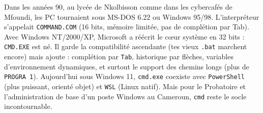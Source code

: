 \documentclass[11pt]{article}
\begin{document}
\begin{savaistu}
Dans les années 90, au lycée de Nkolbisson comme dans les cybercafés de Mfoundi, les PC tournaient sous MS-DOS 6.22 ou Windows 95/98. L'interpréteur s'appelait \texttt{COMMAND.COM} (16 bits, mémoire limitée, pas de complétion par Tab). Avec Windows NT/2000/XP, Microsoft a réécrit le cœur système en 32 bits : \texttt{CMD.EXE} est né. Il garde la compatibilité ascendante (tes vieux \texttt{.bat} marchent encore) mais ajoute : complétion par \texttt{Tab}, historique par flèches, variables d'environnement dynamiques, et surtout le support des chemins longs (plus de \texttt{PROGRA~1}). Aujourd'hui sous Windows 11, \texttt{cmd.exe} coexiste avec \texttt{PowerShell} (plus puissant, orienté objet) et \texttt{WSL} (Linux natif). Mais pour le Probatoire et l'administration de base d'un poste Windows au Cameroun, \texttt{cmd} reste le socle incontournable.
\end{savaistu}
\end{document}

